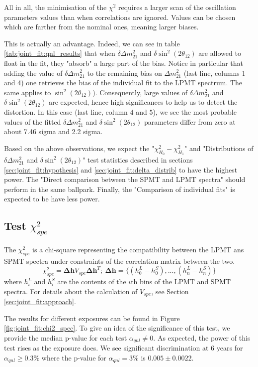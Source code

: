 \documentclass[../main.tex]{subfiles}
\begin{document}
All in all, the minimisation of the $\chi^2$ requires a larger scan of the oscillation parameters values than when correlations are ignored. Values can be chosen which are farther from the nominal ones, meaning larger biases.

This is actually an advantage. Indeed, we can see in table \ref{tab:joint_fit:qnl_results} that when $\delta \Delta m^2_{21}$ and $\delta \sin^2(2 \theta_{12})$ are allowed to float in the fit, they "absorb" a large part of the bias. Notice in particular that adding the value of $\delta \Delta m^2_{21}$ to the remaining bias on $\Delta m^2_{21}$ (last line, columns 1 and 4) one retrieves the bias of the individual fit to the LPMT spectrum. The same applies to $\sin^2(2\theta_{12})$). Consequently, large values of $\delta \Delta m^2_{21}$ and  $\delta \sin^2(2 \theta_{12})$ are expected, hence high significances to help us to detect the distortion. In this case (last line, column 4 and 5), we see the most probable values of the fitted $\delta \Delta m^2_{21}$ and $\delta \sin^2(2 \theta_{12})$ parameters differ from zero at about 7.46 sigma and 2.2 sigma.

Based on the above observations, we expect the "$\chi^2_{H_0}-\chi^2_{H_1}$" and "Distributions of $\delta \Delta m^2_{21}$
and  $\delta \sin^2(2 \theta_{12})$" test statistics described in sections \ref{sec:joint_fit:hypothesis} and \ref{sec:joint_fit:delta_distrib} to have the highest power.
The "Direct comparison between the SPMT and LPMT spectra" should perform in the same ballpark. Finally, the "Comparison of individual fits" is expected to be have less power.

\subsection{Test $\chi^2_{spe}$}

The $\chi^2_{spe}$ is a chi-square representing the compatibility between the LPMT ans SPMT spectra under constraints of the correlation matrix between the two.
\begin{equation}
  \chi^2_{spe} = \bm{\Delta h} V_{spe} \bm{\Delta h}^T; ~ \bm{\Delta h} = \{ (h_0^L - h_0^S), ..., (h_n^L - h_n^S) \}
\end{equation}
where $h_i^L$ and $h_i^S$ are the contents of the $i$th bins of the LPMT and SPMT spectra. For details about the calculation of $V_{spe}$, see Section \ref{sec:joint_fit:approach}.

The results for different exposures can be found in Figure \ref{fig:joint_fit:chi2_spec}. To give an idea of the significance of this test, we provide the median p-value for each test $\alpha_{qnl} \neq 0$. As expected, the power of this test rises as the exposure does. We see significant discrimination at 6 years for $\alpha_{qnl} \geq 0.3 \%$ where the p-value for $\alpha_{qnl} = 3\%$ is $0.005 \pm 0.0022$.
\end{document}
